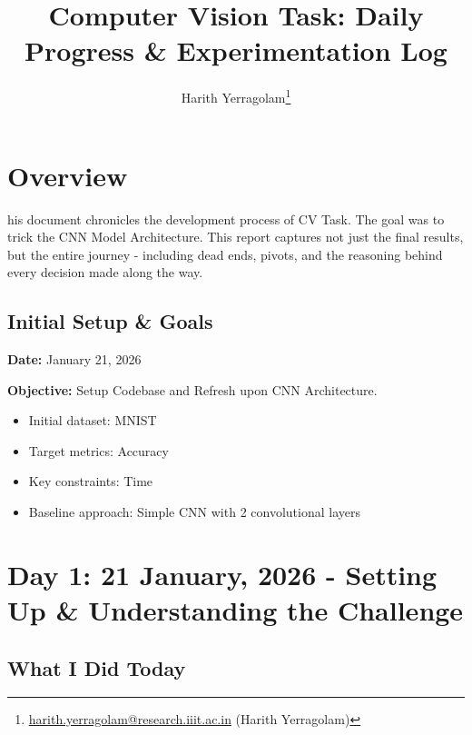 \documentclass[9pt,a4paper,twocolumn,twoside]{tau-class/tau}
\title{Computer Vision Task: Daily Progress \& Experimentation Log}
\author[1]{Harith Yerragolam\thanks{\href{mailto:harith.yerragolam@research.iiit.ac.in}{harith.yerragolam@research.iiit.ac.in} (Harith Yerragolam)}}
\affil[a]{IIIT Hyderabad}
\begin{document}
		
    \maketitle 
    \thispagestyle{firststyle}
    

\section{Overview}

    his document chronicles the development process of CV Task. The goal was to trick the CNN Model Architecture. This report captures not just the final results, but the entire journey - including dead ends, pivots, and the reasoning behind every decision made along the way.

    \subsection{Initial Setup \& Goals}
    
        \textbf{Date:} January 21, 2026
        
        \textbf{Objective:} Setup Codebase and Refresh upon CNN Architecture.
        
        \begin{itemize}
            \item Initial dataset: MNIST
            \item Target metrics: Accuracy
            \item Key constraints: Time
            \item Baseline approach: Simple CNN with 2 convolutional layers
        \end{itemize}
        

\section{Day 1: 21 January, 2026 - Setting Up \& Understanding the Challenge}

    \subsection{What I Did Today}
    
\end{document}
